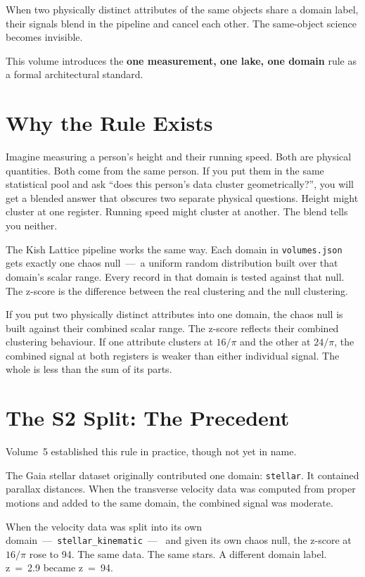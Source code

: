 \documentclass[11pt, letterpaper, openany]{book}
\begin{document}
When two physically distinct attributes of the same objects share a domain label,
their signals blend in the pipeline and cancel each other. The same-object science
becomes invisible.

This volume introduces the \textbf{one measurement, one lake, one domain} rule as a
formal architectural standard.

\section{Why the Rule Exists}

Imagine measuring a person's height and their running speed. Both are physical
quantities. Both come from the same person. If you put them in the same statistical
pool and ask ``does this person's data cluster geometrically?'', you will get a
blended answer that obscures two separate physical questions. Height might cluster
at one register. Running speed might cluster at another. The blend tells you neither.

The Kish Lattice pipeline works the same way. Each domain in \texttt{volumes.json}
gets exactly one chaos null~---~a uniform random distribution built over that
domain's scalar range. Every record in that domain is tested against that null.
The z-score is the difference between the real clustering and the null clustering.

If you put two physically distinct attributes into one domain, the chaos null is
built against their combined scalar range. The z-score reflects their combined
clustering behaviour. If one attribute clusters at $16/\pi$ and the other at
$24/\pi$, the combined signal at both registers is weaker than either individual
signal. The whole is less than the sum of its parts.

\section{The S2 Split: The Precedent}

Volume~5 established this rule in practice, though not yet in name.

The Gaia stellar dataset originally contributed one domain: \texttt{stellar}. It
contained parallax distances. When the transverse velocity data was computed from
proper motions and added to the same domain, the combined signal was moderate.

When the velocity data was split into its own domain~---~\texttt{stellar\_kinematic}~---~
and given its own chaos null, the z-score at $16/\pi$ rose to 94. The same data.
The same stars. A different domain label. z~=~2.9 became z~=~94.
\end{document}
